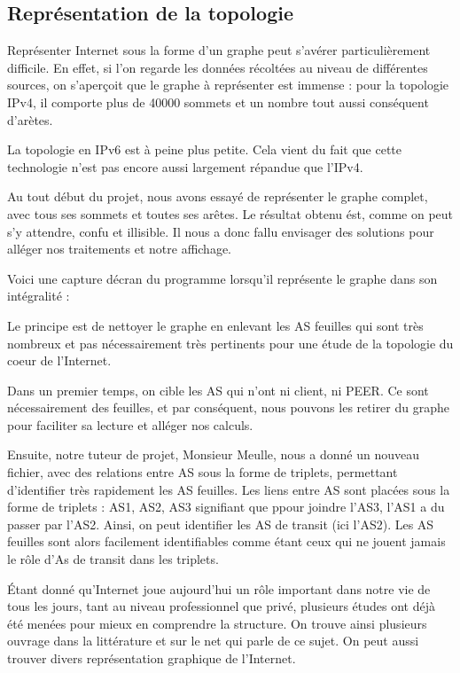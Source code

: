 
% 

\subsection{Repr\'esentation de la topologie}

Repr\'esenter Internet sous la forme d'un graphe peut s'av\'erer particulièrement difficile. En effet, si l'on regarde les donn\'ees r\'ecolt\'ees au niveau de diff\'erentes sources, on s'aperçoit que le graphe \`a repr\'esenter est immense : pour la topologie IPv4, il comporte plus de 40000 sommets et un nombre tout aussi cons\'equent d'ar\`etes.
\par
La topologie en IPv6 est \`a peine plus petite. Cela vient du fait que cette technologie n'est pas encore aussi largement r\'epandue que l'IPv4.

\par
Au tout d\'ebut du projet, nous avons essayé de repr\'esenter le graphe complet, avec tous ses sommets et toutes ses ar\^etes. Le r\'esultat obtenu \'est, comme on peut s'y attendre, confu et illisible. Il nous a donc fallu envisager des solutions pour all\'eger nos traitements et notre affichage.
\par
Voici une capture d\'ecran du programme lorsqu'il repr\'esente le graphe dans son int\'egralit\'e :
\par
Le principe est de nettoyer le graphe en enlevant les AS feuilles qui sont tr\`es nombreux et pas nécessairement tr\`es pertinents pour une \'etude de la topologie du coeur de l'Internet. 
\par
Dans un premier temps, on cible les AS qui n'ont ni client, ni PEER. Ce sont n\'ecessairement des feuilles, et par cons\'equent, nous pouvons les retirer du graphe pour faciliter sa lecture et alléger nos calculs.
\par Ensuite, notre tuteur de projet, Monsieur Meulle, nous a donn\'e un nouveau fichier, avec des relations entre AS sous la forme de triplets, permettant d'identifier tr\`es rapidement les AS feuilles.
Les liens entre AS sont plac\'ees sous la forme de triplets : {AS1, AS2, AS3} signifiant que ppour joindre l'AS3, l'AS1 a du passer par l'AS2. Ainsi, on peut identifier les AS de transit (ici l'AS2). Les AS feuilles sont alors facilement identifiables comme \'etant ceux qui ne jouent jamais le r\^ole d'As de transit dans les triplets.
\par
\'Etant donn\'e qu'Internet joue aujourd'hui un r\^ole important dans notre vie de tous les jours, tant au niveau professionnel que priv\'e, plusieurs \'etudes ont d\'ej\`a \'et\'e men\'ees pour mieux en comprendre la structure.
On trouve ainsi plusieurs ouvrage dans la litt\'erature et sur le net qui parle de ce sujet. On peut aussi trouver divers repr\'esentation graphique de l'Internet.

%